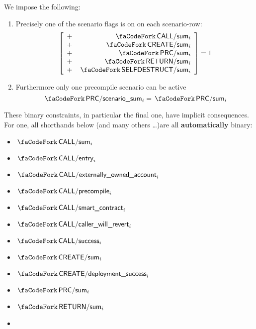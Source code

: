 \begin{center}
\end{center}
We impose the following:
\begin{enumerate}[resume]
	\item Precisely one of the scenario flags is on on each scenario-row:
		\[
			\left[ \begin{array}{cr}
				+ & \scenCallSum          _{i} \\
				+ & \scenCreateSum        _{i} \\
				+ & \scenPrecompileSum    _{i} \\
				+ & \scenReturnSum        _{i} \\
				+ & \scenSelfdestructSum  _{i} \\
			\end{array} \right]
			= 1
		\]
	\item Furthermore only one precompile scenario can be active
		\[
			\scenPrcScenarioSum_{i} = \scenPrecompileSum_{i}
		\]
\end{enumerate}
\saNote{} These binary constraints, in particular the final one, have implicit consequences. For one, all shorthands below (and many others \dots)are all \textbf{automatically} binary:
\begin{multicols}{2}
	\begin{itemize}
		\item $\scenCallSum_{i}$
		\item $\scenCallEntry_{i}$
		\item $\scenCallEoa_{i}$
		\item $\scenCallPrc_{i}$
		\item $\scenCallSmc_{i}$
		\item $\scenCallerWillRevert_{i}$
		\item $\scenCallSuccess_{i}$
		\item $\scenCreateSum_{i}$
		\item $\scenCreateSuccess_{i}$
		\item $\scenPrecompileSum_{i}$
		\item $\scenReturnSum_{i}$
		\item[\vspace{\fill}]
	\end{itemize}
\end{multicols}


